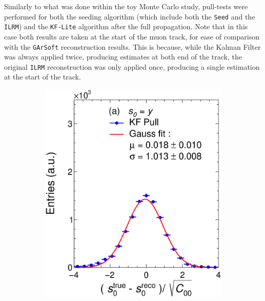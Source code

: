 Similarly to what was done within the toy Monte Carlo study, pull-tests were performed for both the seeding algorithm (which include both the \texttt{Seed} and the \texttt{ILRM}) and the \texttt{KF-Lite} algorithm after the full propagation. Note that in this case both results are taken at the start of the muon track, for ease of comparison with the \texttt{GArSoft} reconstruction results. This is because, while the Kalman Filter was always applied twice, producing estimates at both end of the track, the original \texttt{ILRM} reconstruction was only applied once, producing a single estimation at the start of the track. 


\begin{figure}[t]
     \centering
     \begin{subfigure}{0.32\textwidth}
         \centering
         \includegraphics[width=\textwidth]{figures/ch4-KF_NDGArLite/MC/ALICE+KF/UnitKFEnd_p0.eps}
         \caption{}
         \label{fig:resp0KF_GArLite_ALICE+KF}
     \end{subfigure}
     \begin{subfigure}{0.32\textwidth}
         \centering

\end{subfigure}
\end{figure}
